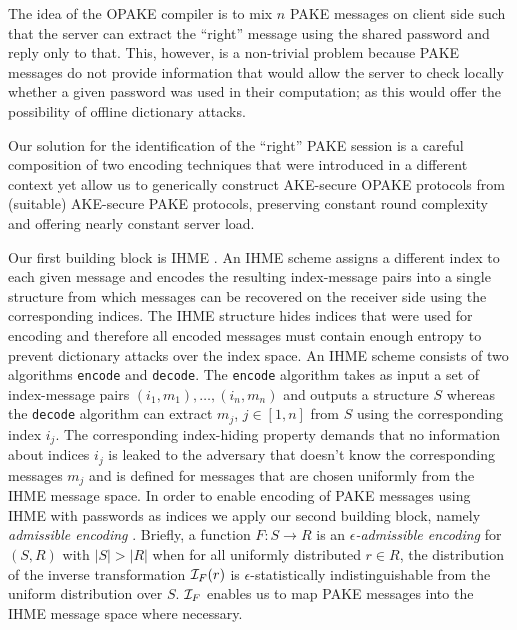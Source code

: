 The idea of the \ac{OPAKE} compiler is to mix $n$ \ac{PAKE} messages on client side such that the server can extract the ``right'' message using the shared password and reply only to that.
This, however, is a non-trivial problem because \ac{PAKE} messages do not provide information that would allow the server to check locally whether a given password was used in their computation; as this would offer the possibility of offline dictionary attacks.

Our solution for the identification of the ``right'' \ac{PAKE} session is a careful composition of two encoding techniques that were introduced in a different context yet allow us to generically construct \ac{AKE}-secure \ac{OPAKE} protocols from (suitable) \ac{AKE}-secure \ac{PAKE} protocols, preserving constant round complexity and offering nearly constant server load.

Our first building block is \ac{IHME} \cite{Manulis2010,Manulis2011}.
An \ac{IHME} scheme assigns a different index to each given message and encodes the resulting index-message pairs into a single structure from which messages can be recovered on the receiver side using the corresponding indices.
The \ac{IHME} structure hides indices that were used for encoding and therefore all encoded messages must contain enough entropy to prevent dictionary attacks over the index space.
An \ac{IHME} scheme consists of two algorithms \texttt{encode} and \texttt{decode}.
The \texttt{encode} algorithm takes as input a set of index-message pairs $(i_1, m_1),\ldots,(i_n, m_n)$ and outputs a structure $S$ whereas the \texttt{decode} algorithm can extract $m_j$, $j\in[1,n]$ from $S$ using the corresponding index $i_j$.
The corresponding index-hiding property demands that no information about indices $i_j$ is leaked to the adversary that doesn't know the corresponding messages $m_j$ and is defined for messages that are chosen uniformly from the \ac{IHME} message space.
In order to enable encoding of \ac{PAKE} messages using \ac{IHME} with passwords as indices we apply our second building block, namely \emph{admissible encoding} \cite{BonehF01,BrierCIMRT10,pseudorandomSignatures}.
Briefly, a function $F:S\rightarrow R$ is an \emph{$\epsilon$-admissible encoding} for $(S,R)$ with $|S|>|R|$ when for all uniformly distributed $r\in R$, the distribution of the inverse transformation $\mathcal{I}_F(r)$ is $\epsilon$-statistically indistinguishable from the uniform distribution over $S$.
$\mathcal{I}_F$ enables us to map \ac{PAKE} messages into the \ac{IHME} message space where necessary.

